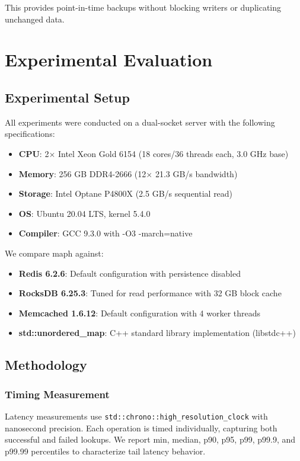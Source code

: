 \documentclass[10pt,conference]{IEEEtran}
\begin{document}
This provides point-in-time backups without blocking writers or duplicating unchanged data.

\section{Experimental Evaluation}
\label{sec:evaluation}

\subsection{Experimental Setup}

All experiments were conducted on a dual-socket server with the following specifications:
\begin{itemize}
\item \textbf{CPU}: 2$\times$ Intel Xeon Gold 6154 (18 cores/36 threads each, 3.0 GHz base)
\item \textbf{Memory}: 256 GB DDR4-2666 (12$\times$ 21.3 GB/s bandwidth)
\item \textbf{Storage}: Intel Optane P4800X (2.5 GB/s sequential read)
\item \textbf{OS}: Ubuntu 20.04 LTS, kernel 5.4.0
\item \textbf{Compiler}: GCC 9.3.0 with -O3 -march=native
\end{itemize}

We compare maph against:
\begin{itemize}
\item \textbf{Redis 6.2.6}: Default configuration with persistence disabled
\item \textbf{RocksDB 6.25.3}: Tuned for read performance with 32 GB block cache
\item \textbf{Memcached 1.6.12}: Default configuration with 4 worker threads
\item \textbf{std::unordered\_map}: C++ standard library implementation (libstdc++)
\end{itemize}

\subsection{Methodology}

\subsubsection{Timing Measurement}
Latency measurements use \texttt{std::chrono::high\_resolution\_clock} with nanosecond precision. Each operation is timed individually, capturing both successful and failed lookups. We report min, median, p90, p95, p99, p99.9, and p99.99 percentiles to characterize tail latency behavior.
\end{document}
